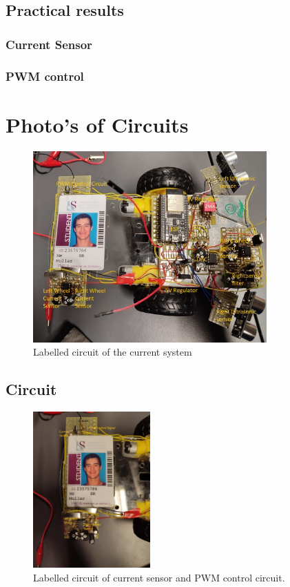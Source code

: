 \subsection{Practical results}
\subsubsection{Current Sensor}
\subsubsection{PWM control}

\clearpage
\section{Photo's of Circuits}
\begin{figure}[H]
\centering
\includegraphics[width = 0.8\textwidth]{./Figures/FullCircuit_2.jpeg}
\caption{Labelled circuit of the current system}
\label{fig:full_prac_cir}
\end{figure}

\subsection{Circuit}
\begin{figure}[H]
\centering
\includegraphics[width = 0.4\textwidth]{./Figures/Cursens_Cir_Left_Card.jpeg}
\caption{Labelled circuit of current sensor and PWM control circuit.}
\label{fig:cursen_cir_card}
\end{figure}
